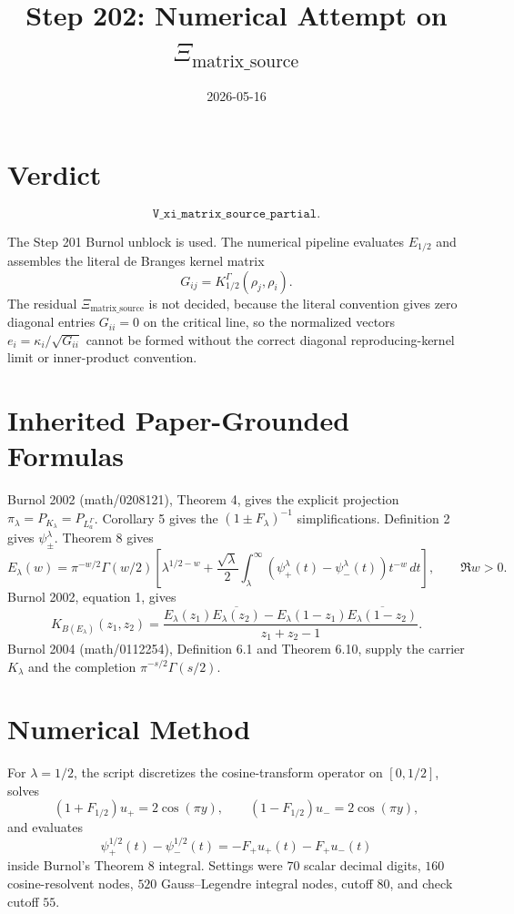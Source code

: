 \documentclass[11pt]{article}
\title{Step 202: Numerical Attempt on \(\Xi_{\mathrm{matrix\_source}}\)}
\date{2026-05-16}
\begin{document}
\maketitle

\section*{Verdict}

\[
\boxed{\texttt{V\_xi\_matrix\_source\_partial}.}
\]

The Step 201 Burnol unblock is used.  The numerical pipeline evaluates
\(E_{1/2}\) and assembles the literal de Branges kernel matrix
\[
G_{ij}=K_{1/2}^{\Gamma}(\rho_j,\rho_i).
\]
The residual \(\Xi_{\mathrm{matrix\_source}}\) is not decided, because the
literal convention gives zero diagonal entries \(G_{ii}=0\) on the critical
line, so the normalized vectors \(e_i=\kappa_i/\sqrt{G_{ii}}\) cannot be
formed without the correct diagonal reproducing-kernel limit or
inner-product convention.

\section*{Inherited Paper-Grounded Formulas}

Burnol 2002 (math/0208121), Theorem 4, gives the explicit projection
\(\pi_\lambda=P_{K_\lambda}=P_{L_a^\Gamma}\).  Corollary 5 gives the
\((1\pm F_\lambda)^{-1}\) simplifications.  Definition 2 gives
\(\psi_\pm^\lambda\).  Theorem 8 gives
\[
E_\lambda(w)=\pi^{-w/2}\Gamma(w/2)\left[
\lambda^{1/2-w}+\frac{\sqrt{\lambda}}{2}
\int_\lambda^\infty
(\psi_+^\lambda(t)-\psi_-^\lambda(t))t^{-w}\,dt\right],
\qquad \Re w>0.
\]
Burnol 2002, equation 1, gives
\[
K_{B(E_\lambda)}(z_1,z_2)=
\frac{E_\lambda(z_1)\overline{E_\lambda(z_2)}
-E_\lambda(1-z_1)\overline{E_\lambda(1-z_2)}}
{z_1+z_2-1}.
\]
Burnol 2004 (math/0112254), Definition 6.1 and Theorem 6.10, supply the
carrier \(K_\lambda\) and the completion
\(\pi^{-s/2}\Gamma(s/2)\).

\section*{Numerical Method}

For \(\lambda=1/2\), the script discretizes the cosine-transform operator on
\([0,1/2]\), solves
\[
(1+F_{1/2})u_+=2\cos(\pi y),\qquad
(1-F_{1/2})u_-=2\cos(\pi y),
\]
and evaluates
\[
\psi_+^{1/2}(t)-\psi_-^{1/2}(t)
=-F_+u_+(t)-F_+u_-(t)
\]
inside Burnol's Theorem 8 integral.  Settings were \(70\) scalar decimal
digits, \(160\) cosine-resolvent nodes, \(520\) Gauss--Legendre integral
nodes, cutoff \(80\), and check cutoff \(55\).
\end{document}
